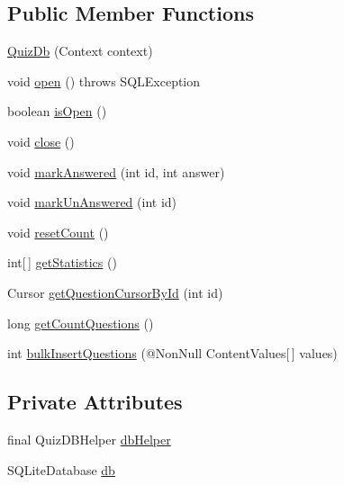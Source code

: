 \subsection*{Public Member Functions}
\begin{DoxyCompactItemize}
\item 
\hyperlink{classorg_1_1buildmlearn_1_1quiztime_1_1data_1_1QuizDb_a9334359d9508981f1f0966008abd6909}{Quiz\+Db} (Context context)
\item 
void \hyperlink{classorg_1_1buildmlearn_1_1quiztime_1_1data_1_1QuizDb_a9e39dc81f9409b9bf824c28e3120a71b}{open} ()  throws S\+Q\+L\+Exception 
\item 
boolean \hyperlink{classorg_1_1buildmlearn_1_1quiztime_1_1data_1_1QuizDb_a3123820e71fdd50d85e38e8616336c2b}{is\+Open} ()
\item 
void \hyperlink{classorg_1_1buildmlearn_1_1quiztime_1_1data_1_1QuizDb_a5c273a86d144df121b2f39bdc844123d}{close} ()
\item 
void \hyperlink{classorg_1_1buildmlearn_1_1quiztime_1_1data_1_1QuizDb_a70e619ce6285f83ad67c4e377cfd0ed8}{mark\+Answered} (int id, int answer)
\item 
void \hyperlink{classorg_1_1buildmlearn_1_1quiztime_1_1data_1_1QuizDb_a7633d3af0b954dbd3cb8b3025f823da7}{mark\+Un\+Answered} (int id)
\item 
void \hyperlink{classorg_1_1buildmlearn_1_1quiztime_1_1data_1_1QuizDb_a3930ba17ef9049e4af07f9ac1434f5a2}{reset\+Count} ()
\item 
int\mbox{[}$\,$\mbox{]} \hyperlink{classorg_1_1buildmlearn_1_1quiztime_1_1data_1_1QuizDb_a98fe6aaf0dd6731729e46951f2b87742}{get\+Statistics} ()
\item 
Cursor \hyperlink{classorg_1_1buildmlearn_1_1quiztime_1_1data_1_1QuizDb_a6250446b407ba398f48170a0be1d594a}{get\+Question\+Cursor\+By\+Id} (int id)
\item 
long \hyperlink{classorg_1_1buildmlearn_1_1quiztime_1_1data_1_1QuizDb_a5cd5b21df19068049247f222e7dfa3d0}{get\+Count\+Questions} ()
\item 
int \hyperlink{classorg_1_1buildmlearn_1_1quiztime_1_1data_1_1QuizDb_a149a42b32825967d6152d2d6a685ab0e}{bulk\+Insert\+Questions} (@Non\+Null Content\+Values\mbox{[}$\,$\mbox{]} values)
\end{DoxyCompactItemize}
\subsection*{Private Attributes}
\begin{DoxyCompactItemize}
\item 
final Quiz\+D\+B\+Helper \hyperlink{classorg_1_1buildmlearn_1_1quiztime_1_1data_1_1QuizDb_a51ccbe1794c8658a74844403d5e621ee}{db\+Helper}
\item 
S\+Q\+Lite\+Database \hyperlink{classorg_1_1buildmlearn_1_1quiztime_1_1data_1_1QuizDb_a1469bd95331121d1ed6270f7bdf7297c}{db}
\end{DoxyCompactItemize}
